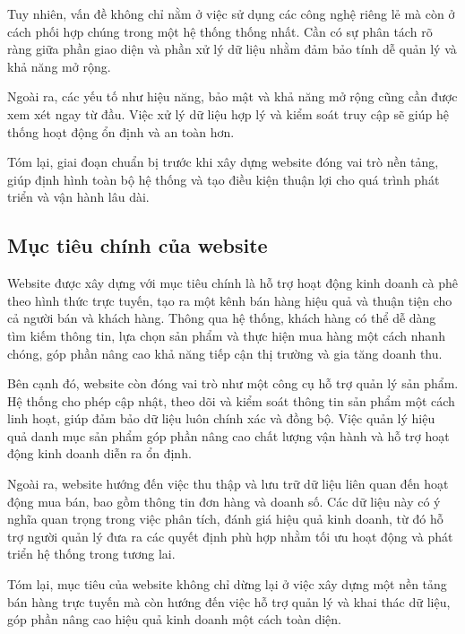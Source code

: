 \documentclass[pt = 12,a4paper]{article}
\begin{document}
\hspace{0.4cm} Tuy nhiên, vấn đề không chỉ nằm ở việc sử dụng các công nghệ riêng lẻ mà còn ở cách phối hợp chúng trong một hệ thống thống nhất. Cần có sự phân tách rõ ràng giữa phần giao diện và phần xử lý dữ liệu nhằm đảm bảo tính dễ quản lý và khả năng mở rộng.

\hspace{0.4cm} Ngoài ra, các yếu tố như hiệu năng, bảo mật và khả năng mở rộng cũng cần được xem xét ngay từ đầu. Việc xử lý dữ liệu hợp lý và kiểm soát truy cập sẽ giúp hệ thống hoạt động ổn định và an toàn hơn.

\hspace{0.4cm} Tóm lại, giai đoạn chuẩn bị trước khi xây dựng website đóng vai trò nền tảng, giúp định hình toàn bộ hệ thống và tạo điều kiện thuận lợi cho quá trình phát triển và vận hành lâu dài.

\subsection{Mục tiêu chính của website}

\hspace{0.4cm} Website được xây dựng với mục tiêu chính là hỗ trợ hoạt động kinh doanh cà phê theo hình thức trực tuyến, tạo ra một kênh bán hàng hiệu quả và thuận tiện cho cả người bán và khách hàng. Thông qua hệ thống, khách hàng có thể dễ dàng tìm kiếm thông tin, lựa chọn sản phẩm và thực hiện mua hàng một cách nhanh chóng, góp phần nâng cao khả năng tiếp cận thị trường và gia tăng doanh thu.

\hspace{0.4cm} Bên cạnh đó, website còn đóng vai trò như một công cụ hỗ trợ quản lý sản phẩm. Hệ thống cho phép cập nhật, theo dõi và kiểm soát thông tin sản phẩm một cách linh hoạt, giúp đảm bảo dữ liệu luôn chính xác và đồng bộ. Việc quản lý hiệu quả danh mục sản phẩm góp phần nâng cao chất lượng vận hành và hỗ trợ hoạt động kinh doanh diễn ra ổn định.

\hspace{0.4cm} Ngoài ra, website hướng đến việc thu thập và lưu trữ dữ liệu liên quan đến hoạt động mua bán, bao gồm thông tin đơn hàng và doanh số. Các dữ liệu này có ý nghĩa quan trọng trong việc phân tích, đánh giá hiệu quả kinh doanh, từ đó hỗ trợ người quản lý đưa ra các quyết định phù hợp nhằm tối ưu hoạt động và phát triển hệ thống trong tương lai.

\hspace{0.4cm} Tóm lại, mục tiêu của website không chỉ dừng lại ở việc xây dựng một nền tảng bán hàng trực tuyến mà còn hướng đến việc hỗ trợ quản lý và khai thác dữ liệu, góp phần nâng cao hiệu quả kinh doanh một cách toàn diện.
\end{document}
